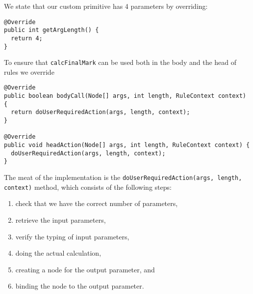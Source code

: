 \documentclass{amsart}
\begin{document}
We state that our custom primitive has 4 parameters by overriding:
\begin{small}
\begin{verbatim}
@Override
public int getArgLength() {
  return 4;
}
\end{verbatim}
\end{small}

To ensure that \texttt{calcFinalMark} can be used both in the body and the head of rules we override
\begin{small}
\begin{verbatim} 
@Override
public boolean bodyCall(Node[] args, int length, RuleContext context) {
  return doUserRequiredAction(args, length, context);
}
  
@Override
public void headAction(Node[] args, int length, RuleContext context) {
  doUserRequiredAction(args, length, context);
}    
\end{verbatim}
\end{small}

The meat of the implementation is the \texttt{doUserRequiredAction(args, length, context)} method, which consists of the following steps:
\begin{enumerate}
 \item check that we have the correct number of parameters,
 \item retrieve the input parameters,
 \item verify the typing of input parameters,
 \item doing the actual calculation,
 \item creating a node for the output parameter, and
 \item binding the node to the output parameter.
\end{enumerate}
\end{document}
